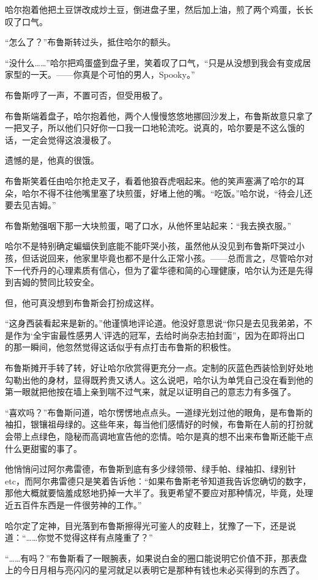 \documentclass[../main]{subfiles}
\begin{document}
哈尔抱着他把土豆饼改成炒土豆，倒进盘子里，然后加上油，煎了两个鸡蛋，长长叹了口气。

“怎么了？”布鲁斯转过头，抵住哈尔的额头。

“没什么\ldots\ldots”哈尔把鸡蛋盛到盘子里，笑着叹了口气，“只是从没想到我会有变成居家型的一天。——你真是个可怕的男人，Spooky。”

布鲁斯哼了一声，不置可否，但受用极了。

布鲁斯端着盘子，哈尔抱着他，两个人慢慢悠悠地挪回沙发上，布鲁斯故意只拿了一把叉子，所以他们只好你一口我一口地轮流吃。说真的，哈尔要是不这么饿的话，一定会觉得这浪漫极了。

遗憾的是，他真的很饿。

布鲁斯笑着任由哈尔抢走叉子，看着他狼吞虎咽起来。他的笑声塞满了哈尔的耳朵，哈尔不得不往他嘴里塞了块煎蛋，好堵上他的嘴。“吃饭。”哈尔说，“待会儿还要去见吉姆。”

布鲁斯勉强咽下那一大块煎蛋，喝了口水，从他怀里站起来：“我去换衣服。”

哈尔不是特别确定蝙蝠侠到底能不能吓哭小孩，虽然他从没见到布鲁斯吓哭过小孩，但话说回来，他家里毕竟也都不是什么正常小孩。——总而言之，尽管哈尔对下一代乔丹的心理素质有信心，但为了霍华德和简的心理健康，哈尔认为还是先得到吉姆的赞同比较安全。

但，他可真没想到布鲁斯会打扮成这样。

“这身西装看起来是新的。”他谨慎地评论道。他没好意思说“你只是去见我弟弟，不是作为`全宇宙最性感男人'评选的冠军，去给时尚杂志拍封面”，因为在即将出口的那一瞬间，他忽然觉得这话似乎有点打击布鲁斯的积极性。

布鲁斯摊开手转了转，好让哈尔欣赏得更充分一点。定制的灰蓝色西装恰到好处地勾勒出他的身材，显得既矜贵又诱人。这么说吧，哈尔认为单凭自己没在看到他的第一眼就把他按在墙上亲到喘不过气来，就足以证明自己的意志力有多强了。

“喜欢吗？”布鲁斯问道，哈尔愣愣地点点头。一道绿光划过他的眼角，是布鲁斯的袖扣，银镶祖母绿的。这些年来，每当他们感情好的时候，布鲁斯在人前的打扮就会带上点绿色，隐秘而高调地宣告他的恋情。哈尔是真的想不出来布鲁斯还能干点什么更甜蜜的事了。

他悄悄问过阿尔弗雷德，布鲁斯到底有多少绿领带、绿手帕、绿袖扣、绿别针etc，而阿尔弗雷德只是笑着告诉他：“如果布鲁斯老爷知道我告诉您确切的数字，那他大概就要恼羞成怒地扔掉一大半了。我更希望不要应对那种情况，毕竟，处理近五百件东西是一件很劳神的工作。”

哈尔定了定神，目光落到布鲁斯擦得光可鉴人的皮鞋上，犹豫了一下，还是说道：“……你觉不觉得这样有点隆重了？”

“……有吗？”布鲁斯看了一眼腕表，如果说白金的圈口能说明它价值不菲，那表盘上的今日月相与亮闪闪的星河就足以表明它是那种有钱也未必买得到的东西了。
\end{document}
